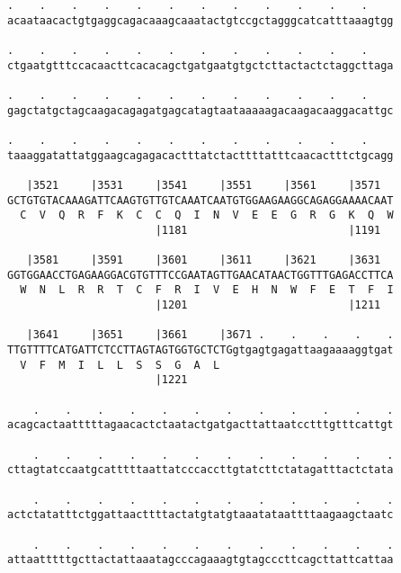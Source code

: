 \documentclass{article}
\begin{document}
\begin{Verbatim}
.    .    .    .    .    .    .    .    .    .    .    .    
acaataacactgtgaggcagacaaagcaaatactgtccgctagggcatcatttaaagtgg
                                                            
.    .    .    .    .    .    .    .    .    .    .    .    
ctgaatgtttccacaacttcacacagctgatgaatgtgctcttactactctaggcttaga
                                                            
.    .    .    .    .    .    .    .    .    .    .    .    
gagctatgctagcaagacagagatgagcatagtaataaaaagacaagacaaggacattgc
                                                            
.    .    .    .    .    .    .    .    .    .    .    .    
taaaggatattatggaagcagagacactttatctacttttatttcaacactttctgcagg
                                                            
   |3521     |3531     |3541     |3551     |3561     |3571  
GCTGTGTACAAAGATTCAAGTGTTGTCAAATCAATGTGGAAGAAGGCAGAGGAAAACAAT
  C  V  Q  R  F  K  C  C  Q  I  N  V  E  E  G  R  G  K  Q  W
                       |1181                         |1191  
  
   |3581     |3591     |3601     |3611     |3621     |3631  
GGTGGAACCTGAGAAGGACGTGTTTCCGAATAGTTGAACATAACTGGTTTGAGACCTTCA
  W  N  L  R  R  T  C  F  R  I  V  E  H  N  W  F  E  T  F  I
                       |1201                         |1211  
  
   |3641     |3651     |3661     |3671 .    .    .    .    .
TTGTTTTCATGATTCTCCTTAGTAGTGGTGCTCTGgtgagtgagattaagaaaaggtgat
  V  F  M  I  L  L  S  S  G  A  L                           
                       |1221                                
  
    .    .    .    .    .    .    .    .    .    .    .    .
acagcactaatttttagaacactctaatactgatgacttattaatcctttgtttcattgt
                                                            
    .    .    .    .    .    .    .    .    .    .    .    .
cttagtatccaatgcatttttaattatcccaccttgtatcttctatagatttactctata
                                                            
    .    .    .    .    .    .    .    .    .    .    .    .
actctatatttctggattaacttttactatgtatgtaaatataattttaagaagctaatc
                                                            
    .    .    .    .    .    .    .    .    .    .    .    .
attaatttttgcttactattaaatagcccagaaagtgtagcccttcagcttattcattaa
                                                            

\end{Verbatim}
\end{document}
